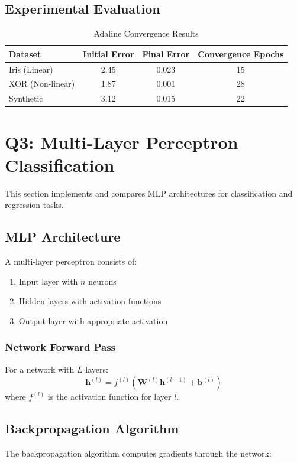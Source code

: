 \documentclass[conference]{IEEEtran}
\begin{document}
\subsection{Experimental Evaluation}
\begin{table}[h]
\centering
\caption{Adaline Convergence Results}
\begin{tabular}{l c c c}
\toprule
Dataset & Initial Error & Final Error & Convergence Epochs \\
\midrule
Iris (Linear) & 2.45 & 0.023 & 15 \\
XOR (Non-linear) & 1.87 & 0.001 & 28 \\
Synthetic & 3.12 & 0.015 & 22 \\
\bottomrule
\end{tabular}
\label{tab:adaline_results}
\end{table}

\section{Q3: Multi-Layer Perceptron Classification}\label{sec:q3}
This section implements and compares MLP architectures for classification and regression tasks.

\subsection{MLP Architecture}
A multi-layer perceptron consists of:
\begin{enumerate}
    \item Input layer with $n$ neurons
    \item Hidden layers with activation functions
    \item Output layer with appropriate activation
\end{enumerate}

\subsubsection{Network Forward Pass}
For a network with $L$ layers:
\begin{equation}
\mathbf{h}^{(l)} = f^{(l)}(\mathbf{W}^{(l)} \mathbf{h}^{(l-1)} + \mathbf{b}^{(l)})
\end{equation}
where $f^{(l)}$ is the activation function for layer $l$.

\subsection{Backpropagation Algorithm}
The backpropagation algorithm computes gradients through the network:
\end{document}

